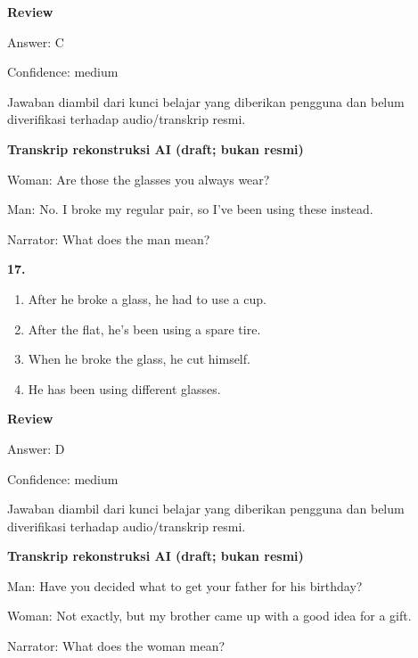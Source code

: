 \documentclass[12pt]{article}
\begin{document}
\par
\begingroup
\setlength{\parskip}{0pt}
\setlength{\parindent}{0pt}
\textbf{Review}\par
Answer: C\par
Confidence: medium\par
Jawaban diambil dari kunci belajar yang diberikan pengguna dan belum diverifikasi terhadap audio/transkrip resmi.\par
\endgroup
\par
\vspace{0.25\baselineskip}
\begin{exampleblock}
\textbf{Transkrip rekonstruksi AI (draft; bukan resmi)}\par
Woman: Are those the glasses you always wear?\par
Man: No. I broke my regular pair, so I've been using these instead.\par
Narrator: What does the man mean?\par
\end{exampleblock}
\noindent\textbf{17.}
\begin{enumerate}[label=(\Alph*),leftmargin=*,itemsep=0.2em]
\item After he broke a glass, he had to use a cup.
\item After the flat, he's been using a spare tire.
\item When he broke the glass, he cut himself.
\item He has been using different glasses.
\end{enumerate}
\par
\begingroup
\setlength{\parskip}{0pt}
\setlength{\parindent}{0pt}
\textbf{Review}\par
Answer: D\par
Confidence: medium\par
Jawaban diambil dari kunci belajar yang diberikan pengguna dan belum diverifikasi terhadap audio/transkrip resmi.\par
\endgroup
\par
\vspace{0.25\baselineskip}
\begin{exampleblock}
\textbf{Transkrip rekonstruksi AI (draft; bukan resmi)}\par
Man: Have you decided what to get your father for his birthday?\par
Woman: Not exactly, but my brother came up with a good idea for a gift.\par
Narrator: What does the woman mean?\par
\end{exampleblock}
\end{document}
